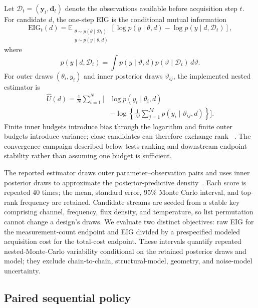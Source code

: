 Let \(\mathcal D_t=(\mathbf y_t,\mathbf d_t)\) denote the observations
available before acquisition step \(t\). For candidate \(d\), the
one-step EIG is the conditional mutual
information~\citep{lindley1956, chaloner1995} \[\mathrm{EIG}_t(d)=
 \mathbb E_{\substack{\theta\sim p(\theta\mid\mathcal D_t)\\
 y\sim p(y\mid\theta,d)}}
 \left[
 \log p(y\mid\theta,d)-\log p(y\mid d,\mathcal D_t)
 \right],
 \label{eq:eig}\] where \[p(y\mid d,\mathcal D_t)=
 \int p(y\mid\vartheta,d)
 p(\vartheta\mid\mathcal D_t)\,d\vartheta .\] For outer draws
\((\theta_i,y_i)\) and inner posterior draws \(\vartheta_{ij}\), the
implemented nested estimator is \[\begin{aligned}
 \widehat U(d)=\frac{1}{N}\sum_{i=1}^{N}\bigg[&
 \log p(y_i\mid\theta_i,d)\\[-0.2ex]
 &-\log\!\left\{\frac{1}{M}\sum_{j=1}^{M}
 p(y_i\mid\vartheta_{ij},d)\right\}\bigg].
 \end{aligned}
 \label{eq:nmc}\] Finite inner budgets introduce bias through the
logarithm and finite outer budgets introduce variance; close candidates
can therefore exchange rank ~\citep{rainforth2018, goda2020}. The
convergence campaign described below tests ranking and downstream
endpoint stability rather than assuming one budget is sufficient.

The reported estimator draws outer parameter--observation pairs and uses
inner posterior draws to approximate the posterior-predictive
density~\citep{ryan2003, rainforth2018}. Each score is repeated 40
times; the mean, standard error, 95\% Monte Carlo interval, and top-rank
frequency are retained. Candidate streams are seeded from a stable key
comprising channel, frequency, flux density, and temperature, so list
permutation cannot change a design's draws. We evaluate two distinct
objectives: raw EIG for the measurement-count endpoint and EIG divided
by a prespecified modeled acquisition cost for the total-cost endpoint.
These intervals quantify repeated nested-Monte-Carlo variability
conditional on the retained posterior draws and model; they exclude
chain-to-chain, structural-model, geometry, and noise-model uncertainty.

\hypertarget{paired-sequential-policy}{%
\subsection{Paired sequential policy}\label{paired-sequential-policy}}

